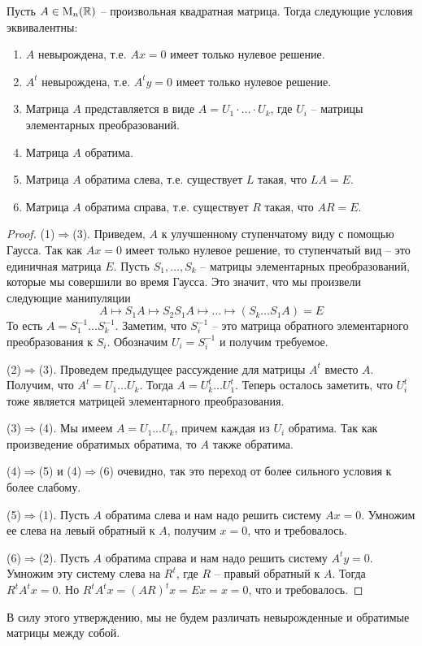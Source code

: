 \begin{claim}\label{claim::InvertibleDiscription}
Пусть $A\in\operatorname{M}_{n}(\mathbb R)$ -- произвольная квадратная матрица. Тогда следующие условия эквивалентны:
\begin{enumerate}
\item $A$ невырождена, т.е. $Ax = 0$ имеет только нулевое решение.
\item $A^t$ невырождена, т.е. $A^ty = 0$ имеет только нулевое решение.
\item Матрица $A$ представляется в виде $A = U_1\cdot \ldots \cdot U_k$, где $U_i$ -- матрицы элементарных преобразований.
\item Матрица $A$ обратима.
\item Матрица $A$ обратима слева, т.е. существует $L$ такая, что $LA = E$.
\item Матрица $A$ обратима справа, т.е. существует $R$ такая, что $AR = E$.
\end{enumerate}
\end{claim}
\begin{proof}
(1)$\Rightarrow$(3). Приведем, $A$ к улучшенному ступенчатому виду с помощью Гаусса. Так как $Ax = 0$ имеет только нулевое решение, то ступенчатый вид -- это единичная матрица $E$. Пусть $S_1, \ldots, S_k$ -- матрицы элементарных преобразований, которые мы совершили во время Гаусса. Это значит, что мы произвели следующие манипуляции
\[
A \mapsto S_1 A \mapsto S_2 S_1 A \mapsto \ldots \mapsto (S_k \ldots S_1 A) = E
\]
То есть $A = S_1^{-1}\ldots S_k^{-1}$. Заметим, что $S_i^{-1}$ -- это матрица обратного элементарного преобразования к $S_i$. Обозначим $U_i = S_i^{-1}$ и получим требуемое.

(2)$\Rightarrow$(3). Проведем предыдущее рассуждение для матрицы $A^t$ вместо $A$. Получим, что $A^t = U_1\ldots U_k$. Тогда $A = U_k^t \ldots U_1^t$. Теперь осталось заметить, что $U_i^t$ тоже является матрицей элементарного преобразования.

(3)$\Rightarrow$(4). Мы имеем $A=U_1\ldots U_k$, причем каждая из $U_i$ обратима. Так как произведение обратимых обратима, то $A$ также обратима.

(4)$\Rightarrow$(5) и (4)$\Rightarrow$(6) очевидно, так это переход от более сильного условия к более слабому.

(5)$\Rightarrow$(1). Пусть $A$ обратима слева и нам надо решить систему $Ax = 0$. Умножим ее слева на левый обратный к $A$, получим $x = 0$, что и требовалось.

(6)$\Rightarrow$(2). Пусть $A$ обратима справа и нам надо решить систему $A^ty = 0$. Умножим эту систему слева на $R^t$, где $R$ -- правый обратный к $A$. Тогда $R^t A^t x = 0$. Но $R^t A^t x = (AR)^tx = Ex = x = 0$, что и требовалось.
\end{proof}

В силу этого утверждению, мы не будем различать невырожденные и обратимые матрицы между собой.
